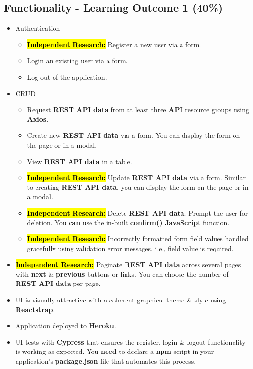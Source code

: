 \documentclass{article}
\begin{document}
\subsection*{Functionality - Learning Outcome 1 (40\%)}
\begin{itemize}
	\item Authentication
	      \begin{itemize}
	      	\item \hl{\textbf{Independent Research:}} Register a new user via a form.
	      	\item Login an existing user via a form.
	      	\item Log out of the application.
	      \end{itemize}
	\item CRUD
	      \begin{itemize}
	      	\item Request \textbf{REST API data} from at least three \textbf{API} resource groups using \textbf{Axios}.
	      	\item Create new \textbf{REST API data} via a form. You can display the form on the page or in a modal. 
	      	\item View \textbf{REST API data} in a table.
	      	\item \hl{\textbf{Independent Research:}} Update \textbf{REST API data} via a form. Similar to creating \textbf{REST API data}, you can display the form on the page or in a modal. 
	      	\item \hl{\textbf{Independent Research:}} Delete \textbf{REST API data}. Prompt the user for deletion. You \textbf{can} use the in-built \textbf{confirm() JavaScript} function. 
	      	\item \hl{\textbf{Independent Research:}} Incorrectly formatted form field values handled gracefully using validation error messages, i.e., field value is required.
	      \end{itemize}
	\item \hl{\textbf{Independent Research:}} Paginate \textbf{REST API data} across several pages with \textbf{next} \& \textbf{previous} buttons or links. You can choose the number of \textbf{REST API data} per page.
	\item UI is visually attractive with a coherent graphical theme \& style using \textbf{Reactstrap}.
	\item Application deployed to \textbf{Heroku}. 
	\item UI tests with \textbf{Cypress} that ensures the register, login \& logout functionality is working as expected. You \textbf{need} to declare a \textbf{npm} script in your application's \textbf{package.json} file that automates this process.
\end{itemize}
\end{document}
